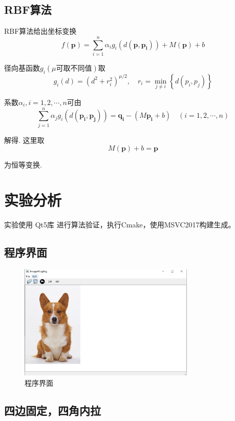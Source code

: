 \documentclass[12pt]{article}
\begin{document}
		\subsection{RBF算法}
		RBF算法给出坐标变换
		$$
		f(\mathbf{p})=\sum_{i=1}^{n} \alpha_{i} g_{i}\left(d\left(\mathbf{p}, \mathbf{p}_{\mathbf{i}}\right)\right)+M(\mathbf{p})+b
		$$
		
		径向基函数$g_{i}\left(\mu\text{可取不同值}\right)$取
		$$
		g_{i}(d)=\left(d^{2}+r_{i}^{2}\right)^{\mu / 2},\quad r_{i}=\min _{j \neq i}\left\{d\left(p_{i}, p_{j}\right)\right\}
		$$
		
		系数$\alpha_{i},i=1,2, \cdots, n$可由
		$$
		\sum_{j=1}^{n} \alpha_{j} g_i\left(d\left(\mathbf{p}_{\mathbf{i}}, \mathbf{p}_{\mathbf{j}}\right)\right)=\mathbf{q}_{\mathbf{i}}-\left(M \mathbf{p}_{\mathbf{i}}+b\right) \quad(i=1,2, \cdots, n)
		$$
		
		解得.
		这里取$$M(\mathbf{p})+b=\mathbf{p}$$
		
		为恒等变换.

	\section{实验分析}
	实验使用 Qt5库 进行算法验证，执行Cmake，使用MSVC2017构建生成。
	
		\subsection{程序界面}
	\begin{figure}[H]
		\centering
		\includegraphics[width=3.3in]{./ui.png}
		\centering
		\caption{程序界面}
	\end{figure}
		
		\subsection{四边固定，四角内拉}
\end{document}
